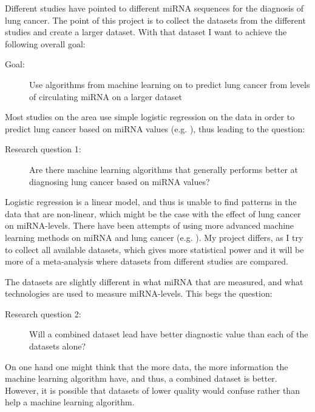 \iffalse

Different studies have pointed to different miRNA sequences for the diagnosis of lung cancer. The point of this project is to collect the datasets from the different studies and create a larger dataset. With that dataset I want to achieve the following overall goal:

\begin{description}
\item[Goal:] Use algorithms from machine learning on to predict lung cancer from levels of circulating miRNA on a larger dataset
\end{description}

Most studies on the area use simple logistic regression on the data in order to predict lung cancer based on miRNA values (e.g. \citep{Wozniak2015,niu2019}), thus leading to the question:

\begin{description}
\item[Research question 1:] Are there machine learning algorithms that generally performs better at diagnosing lung cancer based on miRNA values?
\end{description}

Logistic regression is a linear model, and thus is unable to find patterns in the data that are non-linear, which might be the case with the effect of lung cancer on miRNA-levels. There have been attempts of using more advanced machine learning methods on miRNA and lung cancer (e.g. \citep{maskinrna}). My project differs, as I try to collect all available datasets, which gives more statistical power and it will be more of a meta-analysis where datasets from different studies are compared.

The datasets are slightly different in what miRNA that are measured, and what technologies are used to measure miRNA-levels. This begs the question:

\begin{description}
\item[Research question 2:] Will a combined dataset lead have better diagnostic value than each of the datasets alone?
\end{description}

On one hand one might think that the more data, the more information the machine learning algorithm have, and thus, a combined dataset is better. However, it is possible that datasets of lower quality would confuse rather than help a machine learning algorithm.

